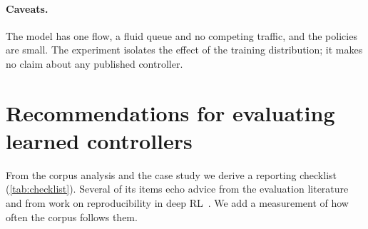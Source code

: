\begin{table}[t]
\centering
\caption{Case study summary: mean over converged seeds and five flows per condition. ``Queue'' is the mean queueing delay in multiples of the base RTT. One of the \nCsSeeds{} broad training seeds collapsed (\nCsCollapsedUtil\% utilization even in distribution) and is excluded here; all \nCsSeeds{} narrow seeds converged.}
\label{tab:case}
\small

\end{table}


\paragraph{Caveats.} The model has one flow, a fluid queue and no competing traffic, and the policies are small. The experiment isolates the effect of the training distribution; it makes no claim about any published controller.

\section{Recommendations for evaluating learned controllers}
\label{sec:recommendations}

From the corpus analysis and the case study we derive a reporting checklist (\cref{tab:checklist}). Several of its items echo advice from the evaluation literature~\cite{vielhaus2026evaluating,giacomoni2024rlcc} and from work on reproducibility in deep RL~\cite{henderson2018deep,agarwal2021deep}. We add a measurement of how often the corpus follows them.

